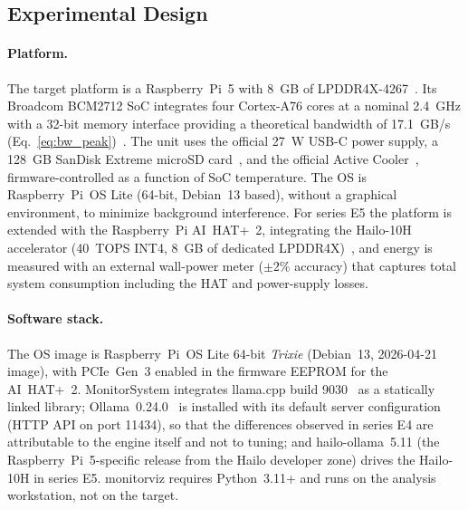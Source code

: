 \documentclass[acmsmall,natbib=false]{acmart}
\begin{document}
\subsection{Experimental Design}\label{sec:design}

\paragraph{Platform.}
The target platform is a Raspberry~Pi~5 with 8~GB of
LPDDR4X-4267~\cite{RPi5ProductBrief2026}. Its Broadcom BCM2712 SoC integrates
four Cortex-A76 cores at a nominal 2.4~GHz with a 32-bit memory interface
providing a theoretical bandwidth of 17.1~GB/s
(Eq.~\eqref{eq:bw_peak})~\cite{BCM2712Doc}. The unit uses
the official 27~W USB-C power supply, a 128~GB SanDisk Extreme microSD
card~\cite{SanDiskExtreme128}, and the
official Active Cooler~\cite{RPiActiveCooler2024}, firmware-controlled as a
function of SoC temperature. The OS is Raspberry~Pi~OS Lite (64-bit,
Debian~13 based), without a graphical environment, to minimize background
interference. For series E5 the platform is extended with the Raspberry~Pi
AI~HAT+~2, integrating the Hailo-10H accelerator (40~TOPS INT4, 8~GB of
dedicated LPDDR4X)~\cite{raspberrypi_ai_hat_plus_2_product_brief}, and energy
is measured with an external wall-power meter ($\pm2\%$ accuracy) that
captures total system consumption including the HAT and power-supply losses.

\paragraph{Software stack.}
The OS image is Raspberry~Pi~OS Lite 64-bit \emph{Trixie} (Debian~13,
2026-04-21 image), with PCIe~Gen~3 enabled in the firmware EEPROM for the
AI~HAT+~2. MonitorSystem integrates llama.cpp build
9030~\cite{gerganov_llamacpp_2023} as a statically linked library;
Ollama~0.24.0~\cite{ollama_2023} is installed with its default server
configuration (HTTP API on port 11434), so that the differences observed in
series E4 are attributable to the engine itself and not to tuning; and
hailo-ollama~5.11 (the Raspberry~Pi~5-specific release from the Hailo
developer zone) drives the Hailo-10H in series E5. monitorviz requires
Python~3.11+ and runs on the analysis workstation, not on the target.
\end{document}
